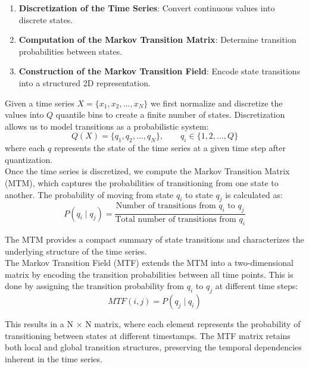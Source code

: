 \begin{enumerate}
    \item \textbf{Discretization of the Time Series}: Convert continuous values into discrete states.
    \item \textbf{Computation of the Markov Transition Matrix}: Determine transition probabilities between states.
    \item \textbf{Construction of the Markov Transition Field}: Encode state transitions into a structured 2D representation.
\end{enumerate}

Given a time series $ X = \{ x_{1}, x_{2}, ... , x_{N} \} $ we first normalize and discretize the values into $Q$ quantile bins to create a finite number of states. Discretization allows us to model transitions as a probabilistic system:
\begin{equation}
    Q(X) = \{ q_{1}, q_{2}, ... , q_{N} \}, \qquad q_{i}\in \{ 1, 2, ... , Q \}
\end{equation}
where each $q$ represents the state of the time series at a given time step after quantization. \\

Once the time series is discretized, we compute the Markov Transition Matrix (MTM), which captures the probabilities of transitioning from one state to another. The probability of moving from state $q_{i}$ to state $q_{j}$ is calculated as:
\begin{equation}
    P(q_{i} \mid q_{j}) = \frac{\text{Number of transitions from } q_{i} \text{ to } q_{j}}{\text{Total number of transitions from } q_{i}}
\end{equation}

The MTM provides a compact summary of state transitions and characterizes the underlying structure of the time series. \\

The Markov Transition Field (MTF) extends the MTM into a two-dimensional matrix by encoding the transition probabilities between all time points. This is done by assigning the transition probability from $q_i$ to $q_j$ at different time steps:
\begin{equation}
    MTF(i,j) = P( q_j \mid q_i)
\end{equation}

This results in a N × N matrix, where each element represents the probability of transitioning between states at different timestamps. The MTF matrix retains both local and global transition structures, preserving the temporal dependencies inherent in the time series.

